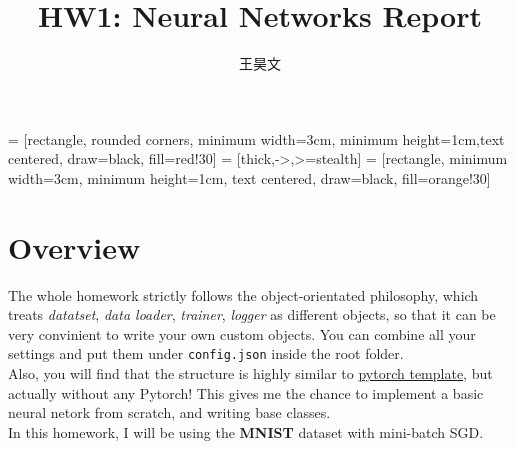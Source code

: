 \documentclass{article}
\begin{document}
\title{HW1: Neural Networks Report}
\author{王昊文}

\maketitle


\lstset{style=mystyle}

\renewcommand{\figurename}{Figure}

\usetikzlibrary{shapes.geometric, arrows}
 = [rectangle, rounded corners, minimum width=3cm, minimum height=1cm,text centered, draw=black, fill=red!30]
 = [thick,->,>=stealth]
 = [rectangle, minimum width=3cm, minimum height=1cm, text centered, draw=black, fill=orange!30]

\section{Overview}
    The whole homework strictly follows the object-orientated philosophy, which 
    treats \emph{datatset}, \emph{data loader}, \emph{trainer}, \emph{logger} as 
    different objects, so that it can be very convinient to write your own custom
    objects. You can combine all your settings and put them under \verb|config.json|
    inside the root folder. \\ 
    \indent Also, you will find that the structure is highly similar to 
    \href{https://github.com/victoresque/pytorch-template}{pytorch template},
    but actually without any Pytorch! This gives me the chance to implement 
    a basic neural netork from scratch, and writing base classes. \\
    \indent In this homework, I will be using the \textbf{MNIST} dataset with mini-batch
    SGD.
    
\end{document}
